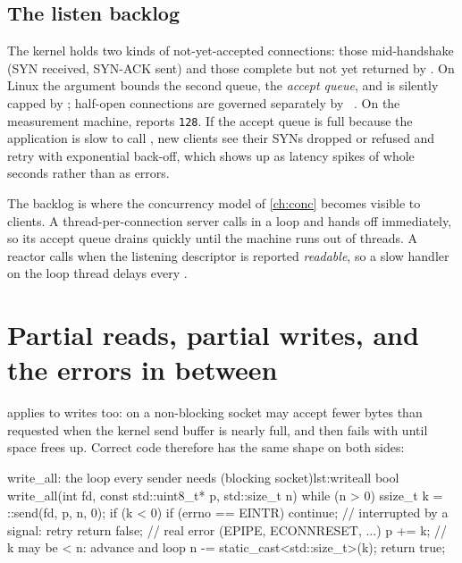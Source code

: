 \subsection{The listen backlog}
The kernel holds two kinds of not-yet-accepted connections: those mid-handshake (SYN received, SYN-ACK sent) and those
complete but not yet returned by . On Linux the  argument bounds the second queue, the
\emph{accept queue}, and is silently capped by ; half-open connections are governed separately by
~\cite{kerrisk2010tlpi}. On the measurement machine,  reports
\texttt{128}. If the accept queue is full because the application is slow to call , new clients see their SYNs
dropped or refused and retry with exponential back-off, which shows up as latency spikes of whole seconds rather than as
errors.

\begin{remarkbox}
The backlog is where the concurrency model of \cref{ch:conc} becomes visible to clients. A thread-per-connection server
calls  in a loop and hands off immediately, so its accept queue drains quickly until the machine runs out of
threads. A reactor calls  when the listening descriptor is reported \emph{readable}, so a slow handler on the
loop thread delays every .
\end{remarkbox}

\section{Partial reads, partial writes, and the errors in between}
 applies to writes too:  on a non-blocking socket may accept fewer bytes than requested
when the kernel send buffer is nearly full, and then fails with  until space frees up. Correct code therefore
has the same shape on both sides:

\begin{code}{write\_all: the loop every sender needs (blocking socket)}{lst:writeall}
bool write_all(int fd, const std::uint8_t* p, std::size_t n) {
    while (n > 0) {
        ssize_t k = ::send(fd, p, n, 0);
        if (k < 0) {
            if (errno == EINTR) continue;   // interrupted by a signal: retry
            return false;                   // real error (EPIPE, ECONNRESET, ...)
        }
        p += k;                              // k may be < n: advance and loop
        n -= static_cast<std::size_t>(k);
    }
    return true;
}
\end{code}

